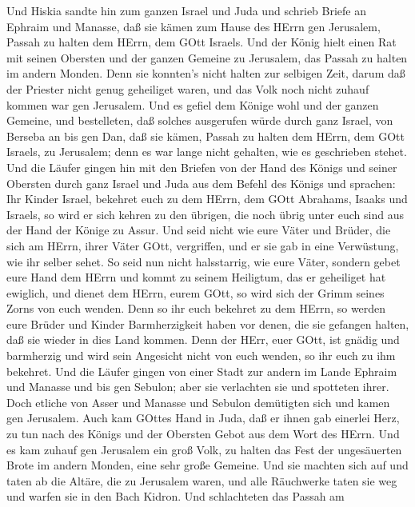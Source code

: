  Und Hiskia sandte hin zum ganzen Israel und Juda und
schrieb Briefe an Ephraim und Manasse, daß sie kämen zum Hause des HErrn
gen Jerusalem, Passah zu halten dem HErrn, dem GOtt Israels.
 Und der König hielt einen Rat mit seinen Obersten und der
ganzen Gemeine zu Jerusalem, das Passah zu halten im andern Monden.
 Denn sie konnten's nicht halten zur selbigen Zeit, darum
daß der Priester nicht genug geheiliget waren, und das Volk noch nicht
zuhauf kommen war gen Jerusalem.  Und es gefiel dem Könige
wohl und der ganzen Gemeine,  und bestelleten, daß solches
ausgerufen würde durch ganz Israel, von Berseba an bis gen Dan, daß sie
kämen, Passah zu halten dem HErrn, dem GOtt Israels, zu Jerusalem; denn
es war lange nicht gehalten, wie es geschrieben stehet.  Und
die Läufer gingen hin mit den Briefen von der Hand des Königs und seiner
Obersten durch ganz Israel und Juda aus dem Befehl des Königs und
sprachen: Ihr Kinder Israel, bekehret euch zu dem HErrn, dem GOtt
Abrahams, Isaaks und Israels, so wird er sich kehren zu den übrigen, die
noch übrig unter euch sind aus der Hand der Könige zu Assur.
 Und seid nicht wie eure Väter und Brüder, die sich am
HErrn, ihrer Väter GOtt, vergriffen, und er sie gab in eine Verwüstung,
wie ihr selber sehet.  So seid nun nicht halsstarrig, wie
eure Väter, sondern gebet eure Hand dem HErrn und kommt zu seinem
Heiligtum, das er geheiliget hat ewiglich, und dienet dem HErrn, eurem
GOtt, so wird sich der Grimm seines Zorns von euch wenden. 
Denn so ihr euch bekehret zu dem HErrn, so werden eure Brüder und Kinder
Barmherzigkeit haben vor denen, die sie gefangen halten, daß sie wieder
in dies Land kommen. Denn der HErr, euer GOtt, ist gnädig und barmherzig
und wird sein Angesicht nicht von euch wenden, so ihr euch zu ihm
bekehret.  Und die Läufer gingen von einer Stadt zur andern
im Lande Ephraim und Manasse und bis gen Sebulon; aber sie verlachten
sie und spotteten ihrer.  Doch etliche von Asser und
Manasse und Sebulon demütigten sich und kamen gen Jerusalem.
 Auch kam GOttes Hand in Juda, daß er ihnen gab einerlei
Herz, zu tun nach des Königs und der Obersten Gebot aus dem Wort des
HErrn.  Und es kam zuhauf gen Jerusalem ein groß Volk, zu
halten das Fest der ungesäuerten Brote im andern Monden, eine sehr große
Gemeine.  Und sie machten sich auf und taten ab die Altäre,
die zu Jerusalem waren, und alle Räuchwerke taten sie weg und warfen sie
in den Bach Kidron.  Und schlachteten das Passah am
